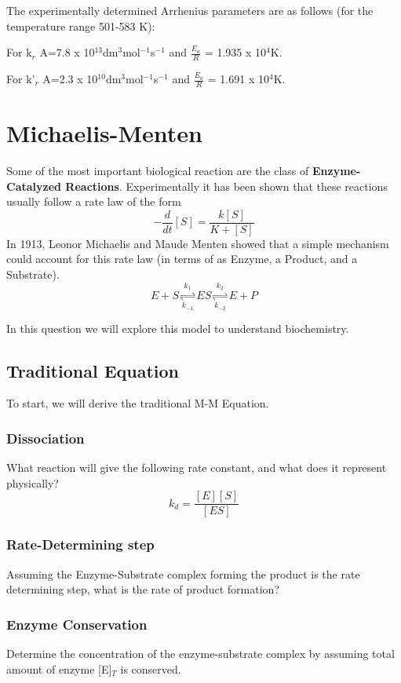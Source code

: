 \documentclass{article}
\newcommand{\be}{\begin{equation}}
\newcommand{\ee}{\end{equation}}
\begin{document}
The experimentally determined Arrhenius parameters are as follows (for the temperature range 501-583 K): 

\bigskip

For k$_r$ A=7.8 x 10$^{13}$dm$^3$mol$^{-1}$s$^{-1}$ and $\frac{E_a}{R}$ = 1.935 x 10$^4$K. 

\bigskip

For k'$_r$ A=2.3 x 10$^{10}$dm$^3$mol$^{-1}$s$^{-1}$ and $\frac{E_a}{R}$ = 1.691 x 10$^4$K. 

\section{Michaelis-Menten}
Some of the most important biological reaction are the class of \textbf{Enzyme-Catalyzed Reactions}. 
Experimentally it has been shown that these reactions usually follow a rate law of the form
\be
-\frac{d}{dt}[S] = \frac{k[S]}{K + [S]}
\ee
In 1913, Leonor Michaelis and Maude Menten showed that  a simple mechanism could account for this rate law (in terms of as Enzyme, a Product, and a Substrate). 
\be\label{MM}
E + S \underset{k_{-1}}{\stackrel{k_1}{\rightleftharpoons}} ES \underset{k_{-2}}{\stackrel{k_2}{\rightleftharpoons}} E + P
\ee

In this question we will explore this model to understand biochemistry. 

\subsection{Traditional Equation}
To start, we will derive the traditional M-M Equation. 

\subsubsection{Dissociation}
What reaction will give the following rate constant, and what does it represent physically?
\be
k_d = \frac{[E][S]}{[ES]}
\ee

\subsubsection{Rate-Determining step}
Assuming the Enzyme-Substrate complex forming the product is the rate determining step, what is the rate of product formation?

\subsubsection{Enzyme Conservation}
Determine the concentration of the enzyme-substrate complex by assuming total amount of enzyme [E]$_T$ is conserved. 
\end{document}
